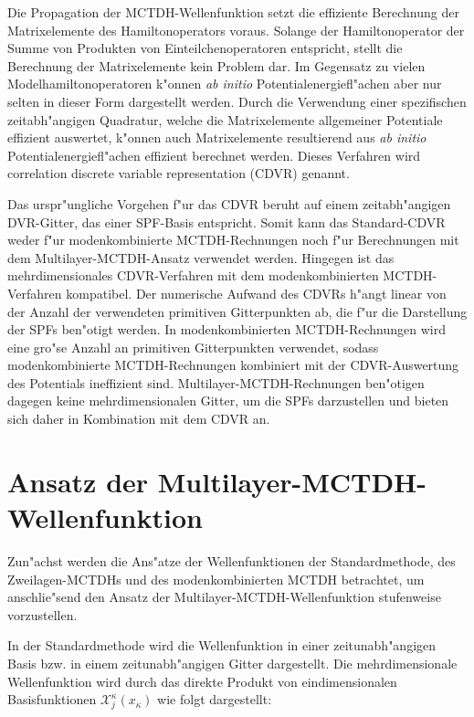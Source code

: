 Die Propagation der MCTDH-Wellenfunktion setzt die effiziente Berechnung der Matrixelemente des Hamiltonoperators voraus.
Solange der Hamiltonoperator der Summe von Produkten von Einteilchenoperatoren \cite{MMC1} entspricht, stellt die Berechnung der Matrixelemente kein Problem dar.
Im Gegensatz zu vielen Modelhamiltonoperatoren k"onnen \textit{ab initio} Potentialenergiefl"achen aber nur selten in dieser Form dargestellt werden.
Durch die Verwendung einer spezifischen zeitabh"angigen Quadratur, welche die Matrixelemente allgemeiner Potentiale effizient auswertet, k"onnen
auch Matrixelemente resultierend aus \textit{ab initio} Potentialenergiefl"achen effizient berechnet werden.
Dieses Verfahren wird correlation discrete variable representation (CDVR) \cite{M3, vHM2} genannt.

Das urspr"ungliche Vorgehen f"ur das CDVR \cite{M3} beruht auf einem zeitabh"angigen DVR-Gitter, das einer SPF-Basis entspricht.
Somit kann das Standard-CDVR weder f"ur modenkombinierte MCTDH-Rechnungen noch f"ur Berechnungen mit dem Multilayer-MCTDH-Ansatz verwendet werden.
Hingegen ist das mehrdimensionales CDVR-Verfah\-ren mit dem modenkombinierten MCTDH-Verfahren kompatibel. \cite{vHM3}
Der numerische Auf\-wand des CDVRs h"angt linear von der Anzahl der verwendeten primitiven Gitterpunkten ab, die f"ur die Darstellung der SPFs ben"otigt werden.
In modenkombinierten MCTDH-Rechnungen wird eine gro"se Anzahl an primitiven Gitterpunkten verwendet, sodass modenkombinierte MCTDH-Rechnungen kombiniert mit der 
CDVR-Auswertung des Potentials ineffizient sind. Multilayer-MCTDH-Rechnungen ben"otigen dagegen keine mehrdimensionalen Gitter, um die SPFs darzustellen und bieten sich
daher in Kombination mit dem CDVR an.


\section{Ansatz der Multilayer-MCTDH-Wellenfunktion}
Zun"achst  werden die Ans"atze der Wellenfunktionen der Standardmethode, des Zweilagen-MCTDHs und des moden\-kombi\-nierten MCTDH betrachtet,
 um anschlie"send den Ansatz der Multi\-layer-MCTDH-Wellenfunktion
stufenweise vorzustellen.

In der Standardmethode wird die Wellenfunktion in einer zeitunabh"angigen Basis bzw. in einem zeitunabh"angigen Gitter dargestellt.
Die mehrdimensionale Wellenfunktion wird durch das direkte Produkt von eindimensionalen Basisfunktionen $\mathcal{X}^{\kappa}_{j}(x_{\kappa})$ wie folgt 
dargestellt:

